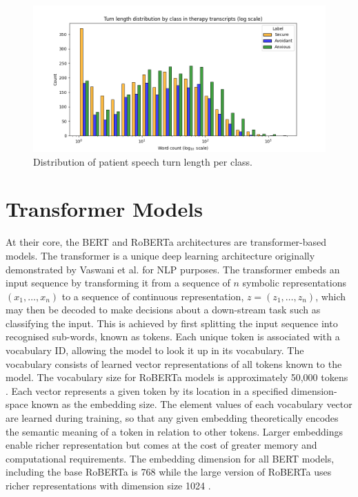 \documentclass[12pt]{report}
\begin{document}
\begin{figure}
    \includegraphics[width=\textwidth]{figures/log_dodge_turn_length_distribution_by_class.png}
    \caption{Distribution of patient speech turn length per class.}
    \label{fig: class balance turn len}
\end{figure}

\chapter{Transformer Models}
\label{App: transformers}
At their core, the BERT and RoBERTa architectures are transformer-based models.
The transformer is a unique deep learning architecture originally demonstrated by Vaswani et al. \citeyear{Vaswani2017} for NLP purposes.
The transformer embeds an input sequence by transforming it from a sequence of $n$ symbolic representations $(x_1, \ldots, x_n)$ to a sequence of continuous representation, $z = (z_1, \ldots, z_n)$, which may then be decoded to make decisions about a down-stream task such as classifying the input.
This is achieved by first splitting the input sequence into recognised sub-words, known as tokens.
Each unique token is associated with a vocabulary ID, allowing the model to look it up in its vocabulary.
The vocabulary consists of learned vector representations of all tokens known to the model.
The vocabulary size for RoBERTa models is approximately 50,000 tokens \cite{roberta}.
Each vector represents a given token by its location in a specified dimension-space known as the embedding size.
The element values of each vocabulary vector are learned during training, so that any given embedding theoretically encodes the semantic meaning of a token in relation to other tokens.
Larger embeddings enable richer representation but comes at the cost of greater memory and computational requirements.
The embedding dimension for all BERT models, including the base RoBERTa is 768 while the large version of RoBERTa uses richer representations with dimension size 1024 \cite{BERT,roberta}.
\end{document}
